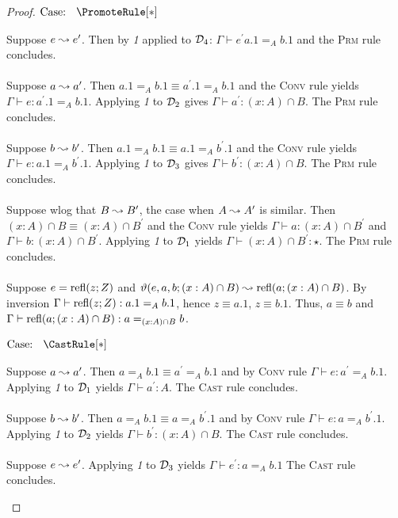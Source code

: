 \begin{proof}
    $\text{Case: }\begin{array}{c} \PromoteRule[*] \end{array}$
    \begin{proofcase}
        Suppose $e \leadsto e^\prime$.
        Then by \textit{1} applied to $\mathcal{D}_{4}$: $\Gamma \vdash e^\prime a.1 =_A b.1$ and the \textsc{Prm} rule concludes.
        \\ \\
        Suppose $a \leadsto a^\prime$.
        Then $a.1 =_A b.1 \equiv a^\prime.1 =_A b.1$ and the \textsc{Conv} rule yields $\Gamma \vdash e : a^\prime.1 =_A b.1$.
        Applying \textit{1} to $\mathcal{D}_{2}$ gives $\Gamma \vdash a^\prime : (x : A) \cap B$.
        The \textsc{Prm} rule concludes.
        \\ \\
        Suppose $b \leadsto b^\prime$.
        Then $a.1 =_A b.1 \equiv a.1 =_A b^\prime.1$ and the \textsc{Conv} rule yields $\Gamma \vdash e : a.1 =_A b^\prime.1$.
        Applying \textit{1} to $\mathcal{D}_{3}$ gives $\Gamma \vdash b^\prime : (x : A) \cap B$.
        The \textsc{Prm} rule concludes.
        \\ \\
        Suppose wlog that $B \leadsto B^\prime$, the case when $A \leadsto A^\prime$ is similar.
        Then $(x : A) \cap B \equiv (x : A) \cap B^\prime$ and the \textsc{Conv} rule yields $\Gamma \vdash a : (x : A) \cap B^\prime$ and $\Gamma \vdash b : (x : A) \cap B^\prime$.
        Applying \textit{1} to $\mathcal{D}_{1}$ yields $\Gamma \vdash (x : A) \cap B^\prime : \star$.
        The \textsc{Prm} rule concludes.
        \\ \\
        Suppose $e = \textnormal{refl}(z;Z)$ and $\vartheta(e, a, b; (x:A) \cap B) \leadsto \textnormal{refl}(a; (x : A) \cap B)$.
        By inversion $\Gamma \vdash \textnormal{refl}(z;Z) : a.1 =_A b.1$, hence $z \equiv a.1$, $z \equiv b.1$.
        Thus, $a \equiv b$ and $\Gamma \vdash \textnormal{refl}(a; (x : A) \cap B) : a =_{(x :A) \cap B} b$.
    \end{proofcase}

    $\text{Case: }\begin{array}{c} \CastRule[*] \end{array}$
    \begin{proofcase}
        Suppose $a \leadsto a^\prime$.
        Then $a =_A b.1 \equiv a^\prime =_A b.1$ and by \textsc{Conv} rule $\Gamma \vdash e : a^\prime =_A b.1$.
        Applying \textit{1} to $\mathcal{D}_{1}$ yields $\Gamma \vdash a^\prime : A$.
        The \textsc{Cast} rule concludes.
        \\ \\
        Suppose $b \leadsto b^\prime$.
        Then $a =_A b.1 \equiv a =_A b^\prime.1$ and by \textsc{Conv} rule $\Gamma \vdash e : a =_A b^\prime.1$.
        Applying \textit{1} to $\mathcal{D}_{2}$ yields $\Gamma \vdash b^\prime : (x : A) \cap B$.
        The \textsc{Cast} rule concludes.
        \\ \\
        Suppose $e \leadsto e^\prime$.
        Applying \textit{1} to $\mathcal{D}_{3}$ yields $\Gamma \vdash e^\prime : a =_A b.1$
        The \textsc{Cast} rule concludes.
    \end{proofcase}


\end{proof}
